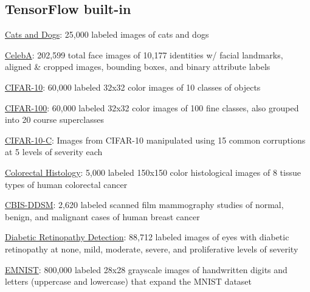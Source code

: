 \documentclass{tufte-handout}
\begin{document}
\subsection*{TensorFlow built-in}\label{tensorflow-built-in-datasets}

\bi
\item
  \href{https://github.com/tensorflow/datasets/blob/master/docs/datasets.md\#cats_vs_dogs}{Cats
  and Dogs}: 25,000 labeled images of cats and dogs
\item
  \href{https://github.com/tensorflow/datasets/blob/master/docs/datasets.md\#celeb_a}{CelebA}:
  202,599 total face images of 10,177 identities w/ facial landmarks,
  aligned \& cropped images, bounding boxes, and binary attribute labels
\item
  \href{https://github.com/tensorflow/datasets/blob/master/docs/datasets.md\#cifar10}{CIFAR-10}:
  60,000 labeled 32x32 color images of 10 classes of objects
\item
  \href{https://github.com/tensorflow/datasets/blob/master/docs/datasets.md\#cifar100}{CIFAR-100}:
  60,000 labeled 32x32 color images of 100 fine classes, also grouped
  into 20 course superclasses
\item
  \href{https://github.com/tensorflow/datasets/blob/master/docs/datasets.md\#cifar10_corrupted}{CIFAR-10-C}:
  Images from CIFAR-10 manipulated using 15 common corruptions at 5
  levels of severity each
\item
  \href{https://github.com/tensorflow/datasets/blob/master/docs/datasets.md\#colorectal_histology}{Colorectal
  Histology}: 5,000 labeled 150x150 color histological images of 8
  tissue types of human colorectal cancer
\item
  \href{https://github.com/tensorflow/datasets/blob/master/docs/datasets.md\#curated_breast_imaging_ddsm}{CBIS-DDSM}:
  2,620 labeled scanned film mammography studies of normal, benign, and
  malignant cases of human breast cancer
\item
  \href{https://github.com/tensorflow/datasets/blob/master/docs/datasets.md\#diabetic_retinopathy_detection}{Diabetic
  Retinopathy Detection}: 88,712 labeled images of eyes with diabetic
  retinopathy at none, mild, moderate, severe, and proliferative levels
  of severity
\item
  \href{https://github.com/tensorflow/datasets/blob/master/docs/datasets.md\#emnist}{EMNIST}:
  800,000 labeled 28x28 grayscale images of handwritten digits and
  letters (uppercase and lowercase) that expand the MNIST dataset
\item
\end{document}
